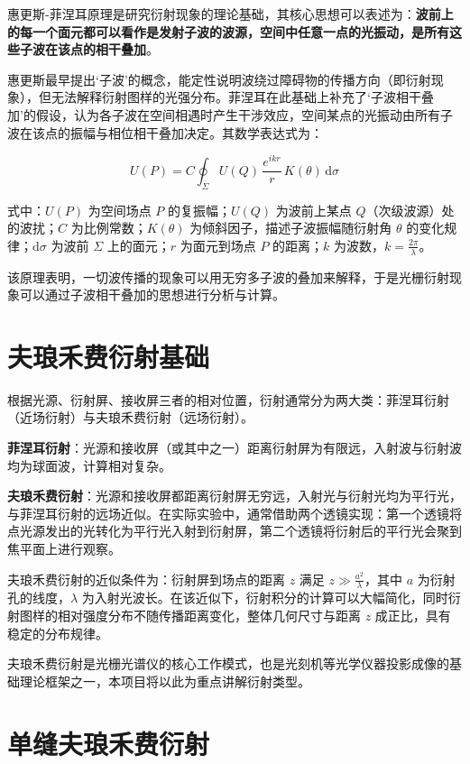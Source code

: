 \documentclass[12pt,a4paper]{ctexrep}
\begin{document}
惠更斯-菲涅耳原理是研究衍射现象的理论基础，其核心思想可以表述为：\textbf{波前上的每一个面元都可以看作是发射子波的波源，空间中任意一点的光振动，是所有这些子波在该点的相干叠加}。

惠更斯最早提出‘子波’的概念，能定性说明波绕过障碍物的传播方向（即衍射现象），但无法解释衍射图样的光强分布。菲涅耳在此基础上补充了‘子波相干叠加’的假设，认为各子波在空间相遇时产生干涉效应，空间某点的光振动由所有子波在该点的振幅与相位相干叠加决定。其数学表达式为：

\begin{equation*}
U(P)=C\oint_{\Sigma}U(Q)\,\frac{e^{ikr}}{r}\,K(\theta)\,\mathrm{d}\sigma
\end{equation*}

\noindent 式中：$U(P)$ 为空间场点 $P$ 的复振幅；$U(Q)$ 为波前上某点 $Q$（次级波源）处的波扰；$C$ 为比例常数；$K(\theta)$ 为倾斜因子，描述子波振幅随衍射角 $\theta$ 的变化规律；$\mathrm{d}\sigma$ 为波前 $\Sigma$ 上的面元；$r$ 为面元到场点 $P$ 的距离；$k$ 为波数，$k=\frac{2\pi}{\lambda}$。

该原理表明，一切波传播的现象可以用无穷多子波的叠加来解释，于是光栅衍射现象可以通过子波相干叠加的思想进行分析与计算。

\section{夫琅禾费衍射基础}

根据光源、衍射屏、接收屏三者的相对位置，衍射通常分为两大类：菲涅耳衍射（近场衍射）与夫琅禾费衍射（远场衍射）。

\textbf{菲涅耳衍射}：光源和接收屏（或其中之一）距离衍射屏为有限远，入射波与衍射波均为球面波，计算相对复杂。

\textbf{夫琅禾费衍射}：光源和接收屏都距离衍射屏无穷远，入射光与衍射光均为平行光，与菲涅耳衍射的远场近似。在实际实验中，通常借助两个透镜实现：第一个透镜将点光源发出的光转化为平行光入射到衍射屏，第二个透镜将衍射后的平行光会聚到焦平面上进行观察。

夫琅禾费衍射的近似条件为：衍射屏到场点的距离 $z$ 满足 $z\gg\frac{{a}^{2}}{\lambda}$，其中 $a$ 为衍射孔的线度，$\lambda$ 为入射光波长。在该近似下，衍射积分的计算可以大幅简化，同时衍射图样的相对强度分布不随传播距离变化，整体几何尺寸与距离 $z$ 成正比，具有稳定的分布规律。

夫琅禾费衍射是光栅光谱仪的核心工作模式，也是光刻机等光学仪器投影成像的基础理论框架之一，本项目将以此为重点讲解衍射类型。

\section{单缝夫琅禾费衍射}
\end{document}
